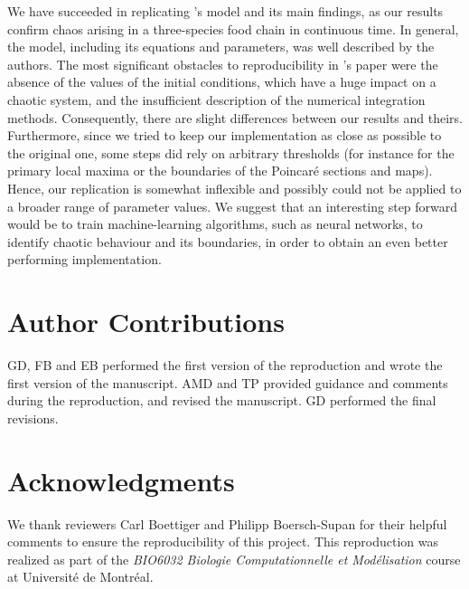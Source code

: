 We have succeeded in replicating \citeauthor{hastings1991}'s model and its main findings, as our
results confirm chaos arising in a three-species food chain in continuous time.
In general, the model, including its equations and parameters, was well described by the
authors. The most significant obstacles to reproducibility in \citeauthor{hastings1991}'s paper
were the absence of the values of the initial conditions, which have a huge impact on a
chaotic system, and the insufficient description of the numerical integration methods.
Consequently, there are slight differences between our results and theirs.
Furthermore, since we tried to keep our implementation as close as possible to the
original one, some steps did rely on arbitrary thresholds (for instance for the primary
local maxima or the boundaries of the Poincaré sections and maps).
Hence, our replication is somewhat inflexible and possibly could not be applied to
a broader range of parameter values.
We suggest that an interesting step forward would be to train machine-learning algorithms,
such as neural networks, to identify chaotic behaviour and its boundaries, in order to
obtain an even better performing implementation.

\section{Author Contributions}
GD, FB and EB performed the first version of the reproduction and wrote the first version of the manuscript. AMD and TP provided guidance and comments during the reproduction, and revised the manuscript. GD performed the final revisions.

\section{Acknowledgments}
We thank reviewers Carl Boettiger and Philipp Boersch-Supan for their helpful comments to ensure the
reproducibility of this project.
This reproduction was realized as part of the \textit{BIO6032 Biologie Computationnelle et Modélisation} course at Université de Montréal.

\newpage

